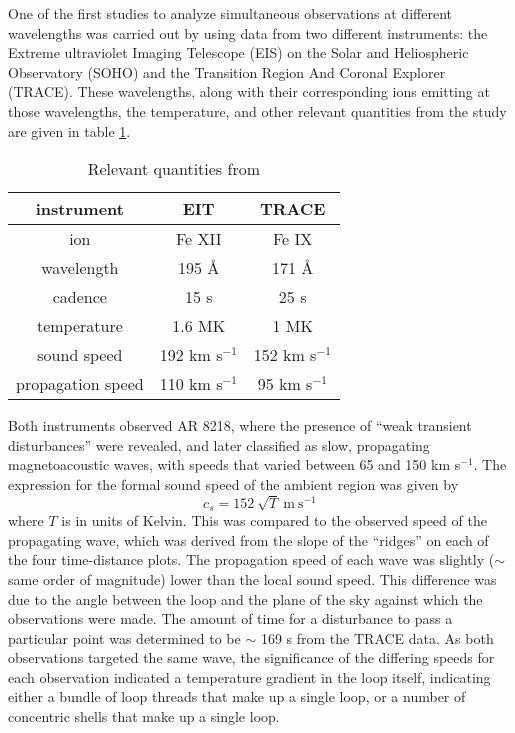\documentclass[preprint2]{aastex}
\begin{document}
One of the first studies to analyze
simultaneous observations at different wavelengths was carried out by
\cite{pac_1} using data from two different instruments:
the Extreme ultraviolet Imaging Telescope (EIS)
on the Solar and Heliospheric Observatory (SOHO) and the
Transition Region And Coronal Explorer (TRACE).
These wavelengths, along with their corresponding ions emitting at those
wavelengths, the temperature, and other relevant quantities from the
study are given in table \ref{stuff}.
\begin{table}[h]
\centering
\begin{tabular}{c c c}
\hline\hline
instrument & EIT & TRACE\\
\hline
ion & Fe {\footnotesize XII} & Fe {\footnotesize IX}\\
wavelength & 195 \AA{} & 171 \AA{}\\
cadence & 15 s & 25 s\\
temperature & 1.6 MK & 1 MK\\
sound speed & 192 km s$^{-1}$ & 152 km s$^{-1}$\\
propagation speed & 110 km s$^{-1}$ & 95 km s$^{-1}$\\
\hline\hline
\end{tabular}
\caption{Relevant quantities from \cite{pac_1}}
\label{stuff}
\end{table}
Both instruments observed AR 8218, where the presence of
``weak transient disturbances'' were revealed, and later classified as
slow, propagating magnetoacoustic waves, with speeds that varied
between 65 and 150 km s$^{-1}$.
The expression for the formal sound speed of the ambient region
was given by
\begin{equation}
    c_{s} = 152\ \sqrt{T}\ \textrm{m}\ \textrm{s}^{-1}
\end{equation}
where $T$ is in units of Kelvin.
This was compared to the observed speed of the propagating wave, which
was derived from the slope of the ``ridges'' on each of the four
time-distance plots.
The propagation speed of each wave was slightly ($\sim$ same order of
magnitude) lower than the local sound speed. This difference
was due to the angle between the loop and the plane of the sky against
which the observations were made.
The amount of time for a disturbance to pass a particular point was
determined to be $\sim$ 169 s from the TRACE data.
As both observations targeted the same wave, the significance of the
differing speeds for each observation indicated a temperature gradient
in the loop itself, indicating either a bundle of loop threads that
make up a single loop, or a number of concentric shells that make up a
single loop.
\end{document}
